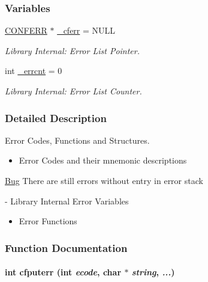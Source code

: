 \subsubsection*{Variables}
\begin{CompactItemize}
\item 
\hypertarget{group__errors_gf90ef6c88b6c820ee65553b7621ac1d3}{
\hyperlink{struct_c_o_n_f_e_r_r}{CONFERR} $\ast$ \hyperlink{group__errors_gf90ef6c88b6c820ee65553b7621ac1d3}{\_\-cferr} = NULL}
\label{group__errors_gf90ef6c88b6c820ee65553b7621ac1d3}

\begin{CompactList}\small\item\em Library Internal: Error List Pointer. \item\end{CompactList}\item 
\hypertarget{group__errors_gbb3fc965f2aa8ec8a52f79975d9f918e}{
int \hyperlink{group__errors_gbb3fc965f2aa8ec8a52f79975d9f918e}{\_\-errcnt} = 0}
\label{group__errors_gbb3fc965f2aa8ec8a52f79975d9f918e}

\begin{CompactList}\small\item\em Library Internal: Error List Counter. \item\end{CompactList}\end{CompactItemize}


\subsubsection{Detailed Description}
Error Codes, Functions and Structures. 

\begin{itemize}
\item Error Codes and their mnemonic descriptions\end{itemize}


\begin{Desc}
\item[\hyperlink{bug__bug000001}{Bug}]There are still errors without entry in error stack\end{Desc}
- Library Internal Error Variables

\begin{itemize}
\item Error Functions \end{itemize}


\subsubsection{Function Documentation}
\hypertarget{group__errors_gad2687826308f21b54657d2728e4cfcc}{
\paragraph[{cfputerr}]{\setlength{\rightskip}{0pt plus 5cm}int cfputerr (int {\em ecode}, \/  char $\ast$ {\em string}, \/   {\em ...})}\hfill}
\label{group__errors_gad2687826308f21b54657d2728e4cfcc}


